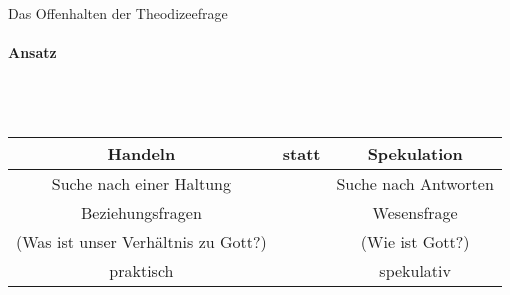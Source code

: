 \documentclass[a4paper]{report}
\begin{document}

	\LARGE{Das Offenhalten der Theodizeefrage}
	
	\paragraph{Ansatz} \mbox{} \\
	\\
	\normalsize
	\begin{tabular}{|c|c|c|}
		\hline
		Handeln & statt & Spekulation \\
		\hline
		Suche nach einer Haltung & & Suche nach Antworten \\
		\hline
		Beziehungsfragen & & Wesensfrage \\
		(Was ist unser Verhältnis zu Gott?) & & (Wie ist Gott?)\\
		\hline
		praktisch & & spekulativ \\
		\hline
	\end{tabular}

	
\end{document}
